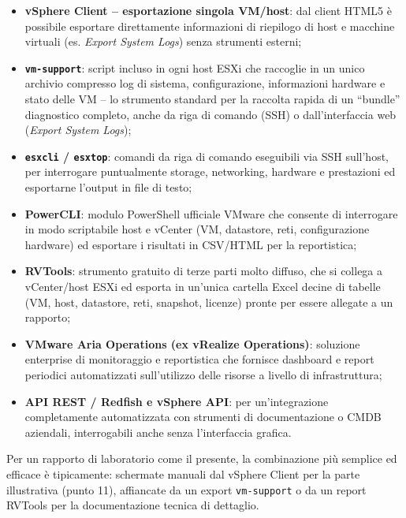 \documentclass[11pt,a4paper]{article}
\begin{document}
\begin{itemize}[nosep]
    \item \textbf{vSphere Client -- esportazione singola VM/host}: dal client HTML5 è possibile esportare direttamente informazioni di riepilogo di host e macchine virtuali (es. \emph{Export System Logs}) senza strumenti esterni;
    \item \textbf{\texttt{vm-support}}: script incluso in ogni host ESXi che raccoglie in un unico archivio compresso log di sistema, configurazione, informazioni hardware e stato delle VM -- lo strumento standard per la raccolta rapida di un ``bundle'' diagnostico completo, anche da riga di comando (SSH) o dall'interfaccia web (\emph{Export System Logs});
    \item \textbf{\texttt{esxcli} / \texttt{esxtop}}: comandi da riga di comando eseguibili via SSH sull'host, per interrogare puntualmente storage, networking, hardware e prestazioni ed esportarne l'output in file di testo;
    \item \textbf{PowerCLI}: modulo PowerShell ufficiale VMware che consente di interrogare in modo scriptabile host e vCenter (VM, datastore, reti, configurazione hardware) ed esportare i risultati in CSV/HTML per la reportistica;
    \item \textbf{RVTools}: strumento gratuito di terze parti molto diffuso, che si collega a vCenter/host ESXi ed esporta in un'unica cartella Excel decine di tabelle (VM, host, datastore, reti, snapshot, licenze) pronte per essere allegate a un rapporto;
    \item \textbf{VMware Aria Operations (ex vRealize Operations)}: soluzione enterprise di monitoraggio e reportistica che fornisce dashboard e report periodici automatizzati sull'utilizzo delle risorse a livello di infrastruttura;
    \item \textbf{API REST / Redfish e vSphere API}: per un'integrazione completamente automatizzata con strumenti di documentazione o CMDB aziendali, interrogabili anche senza l'interfaccia grafica.
\end{itemize}

Per un rapporto di laboratorio come il presente, la combinazione più semplice ed efficace è tipicamente: schermate manuali dal vSphere Client per la parte illustrativa (punto 11), affiancate da un export \texttt{vm-support} o da un report RVTools per la documentazione tecnica di dettaglio.
\end{document}
